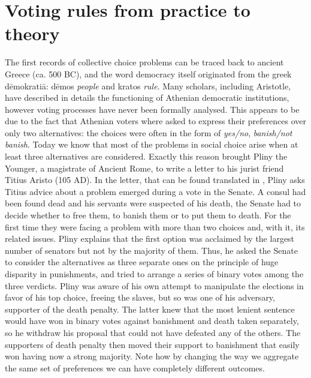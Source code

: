 \section{Voting rules from practice to theory}
The first records of collective choice problems can be traced back to ancient Greece (ca. 500 BC), and the word democracy itself originated from the greek dēmokratiā: dēmos \textit{people} and kratos \textit{rule}. Many scholars, including Aristotle, have described in details the functioning of Athenian democratic institutions, however voting processes have never been formally analysed. This appears to be due to the fact that Athenian voters where asked to express their preferences over only two alternatives: the choices were often in the form of \textit{yes/no}, \textit{banish/not banish}. Today we know that most of the problems in social choice arise when at least three alternatives are considered. Exactly this reason brought Pliny the Younger, a magistrate of Ancient Rome, to write a letter to his jurist friend Titius Aristo (105 AD). In the letter, that can be found translated in \citet[Chapter 2]{McLeanUrken1995}, Pliny asks Titius advice about a problem emerged during a vote in the Senate. A consul had been found dead and his servants were suspected of his death, the Senate had to decide whether to free them, to banish them or to put them to death. For the first time they were facing a problem with more than two choices and, with it, its related issues. Pliny explains that the first option was acclaimed by the largest number of senators but not by the majority of them. Thus, he asked the Senate to consider the alternatives as three separate ones on the principle of huge disparity in punishments, and tried to arrange a series of binary votes among the three verdicts. Pliny was aware of his own attempt to manipulate the elections in favor of his top choice, freeing the slaves, but so was one of his adversary, supporter of the death penalty. The latter knew that the most lenient sentence would have won in binary votes against banishment and death taken separately, so he withdraw his proposal that could not have defeated any of the others. The supporters of death penalty then moved their support to banishment that easily won having now a strong majority. Note how by changing the way we aggregate the same set of preferences we can have completely different outcomes.

